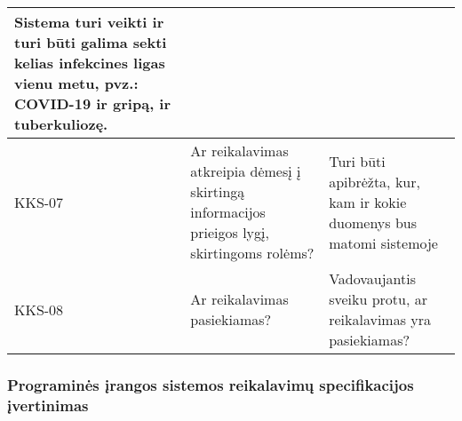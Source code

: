 \documentclass{VUMIFPSkursinis}
\begin{document}
\begin{center}
\begin{longtable}{|C{2cm}|L{5cm}|L{8cm}|}
		Sistema turi veikti ir turi būti galima sekti kelias infekcines ligas vienu metu, pvz.: COVID-19 ir gripą, ir tuberkuliozę.
		\\ \hline
		KKS-07                                                                                        &
		Ar reikalavimas atkreipia dėmesį į skirtingą informacijos prieigos lygį, skirtingoms rolėms?  &
		Turi būti apibrėžta, kur, kam ir kokie duomenys bus matomi sistemoje                                                                                   
		\\ \hline
		KKS-08                                                                                        &
		Ar reikalavimas pasiekiamas?            &
		Vadovaujantis sveiku protu, ar reikalavimas yra pasiekiamas?                                                                              
		\\ \hline                                                                              
	\end{longtable}
\end{center}


\subsubsection{Programinės įrangos sistemos reikalavimų specifikacijos įvertinimas}
\end{document}
